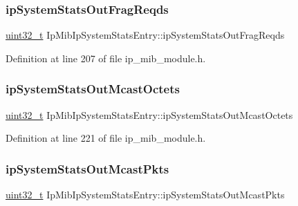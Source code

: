 \subsubsection{\texorpdfstring{ip\+System\+Stats\+Out\+Frag\+Reqds}{ipSystemStatsOutFragReqds}}
{\footnotesize\ttfamily \hyperlink{stdint_8h_a435d1572bf3f880d55459d9805097f62}{uint32\+\_\+t} Ip\+Mib\+Ip\+System\+Stats\+Entry\+::ip\+System\+Stats\+Out\+Frag\+Reqds}



Definition at line 207 of file ip\+\_\+mib\+\_\+module.\+h.

\mbox{\label{structIpMibIpSystemStatsEntry_afd40169086a7fee015ccfd22d26e730f}} 
\subsubsection{\texorpdfstring{ip\+System\+Stats\+Out\+Mcast\+Octets}{ipSystemStatsOutMcastOctets}}
{\footnotesize\ttfamily \hyperlink{stdint_8h_a435d1572bf3f880d55459d9805097f62}{uint32\+\_\+t} Ip\+Mib\+Ip\+System\+Stats\+Entry\+::ip\+System\+Stats\+Out\+Mcast\+Octets}



Definition at line 221 of file ip\+\_\+mib\+\_\+module.\+h.

\mbox{\label{structIpMibIpSystemStatsEntry_ac962272995fc801a9b86c5c606fd4a3f}} 
\subsubsection{\texorpdfstring{ip\+System\+Stats\+Out\+Mcast\+Pkts}{ipSystemStatsOutMcastPkts}}
{\footnotesize\ttfamily \hyperlink{stdint_8h_a435d1572bf3f880d55459d9805097f62}{uint32\+\_\+t} Ip\+Mib\+Ip\+System\+Stats\+Entry\+::ip\+System\+Stats\+Out\+Mcast\+Pkts}



